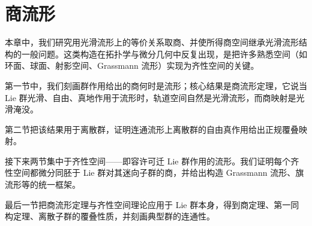 \documentclass[../main.tex]{subfiles}
\begin{document}
\chapter{商流形}\label{chapter:ch21-quotient-manifolds}

本章中，我们研究用光滑流形上的等价关系取商、并使所得商空间继承光滑流形结构的一般问题。这类构造在拓扑学与微分几何中反复出现，是把许多熟悉空间（如环面、球面、射影空间、Grassmann 流形）实现为齐性空间的关键。

第一节中，我们刻画群作用给出的商何时是流形；核心结果是商流形定理，它说当 Lie 群光滑、自由、真地作用于流形时，轨道空间自然是光滑流形，而商映射是光滑淹没。

第二节把该结果用于离散群，证明连通流形上离散群的自由真作用给出正规覆叠映射。

接下来两节集中于齐性空间——即容许可迁 Lie 群作用的流形。我们证明每个齐性空间都微分同胚于 Lie 群对其迷向子群的商，并给出构造 Grassmann 流形、旗流形等的统一框架。

最后一节把商流形定理与齐性空间理论应用于 Lie 群本身，得到商定理、第一同构定理、离散子群的覆叠性质，并刻画典型群的连通性。






\end{document}
